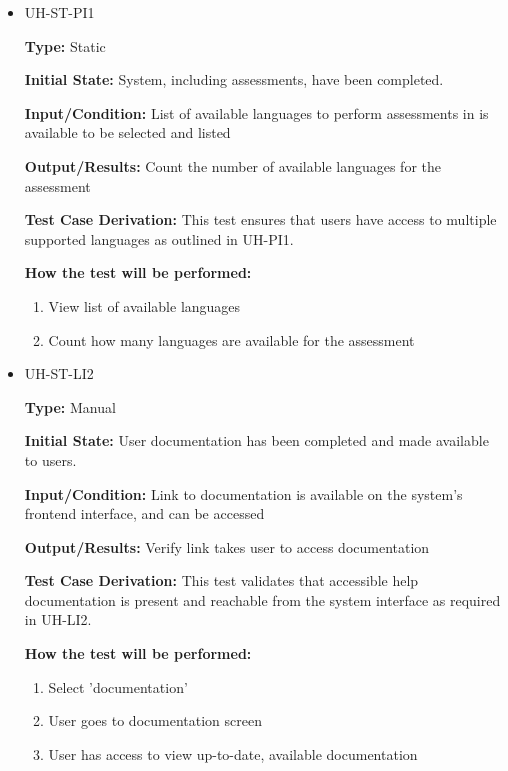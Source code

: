 \documentclass[12pt, titlepage]{article}
\begin{document}
\begin{itemize}
  \item UH-ST-PI1
  \begin{mdframed}[linewidth=0.5mm]
      \textbf{Type:} Static \par
      \textbf{Initial State:} System, including assessments, have been completed. \par
      \textbf{Input/Condition:} List of available languages to perform assessments in is available to be selected and listed \par
      \textbf{Output/Results:} Count the number of available languages for the assessment \par
      \textbf{Test Case Derivation:} This test ensures that users have access to multiple supported languages as outlined in UH-PI1. \par
      \textbf{How the test will be performed:}
      \begin{enumerate}[noitemsep]
        \item View list of available languages
        \item Count how many languages are available for the assessment
      \end{enumerate}
  \end{mdframed}

  \item UH-ST-LI2
  \begin{mdframed}[linewidth=0.5mm]
      \textbf{Type:} Manual \par
      \textbf{Initial State:} User documentation has been completed and made available to users. \par
      \textbf{Input/Condition:} Link to documentation is available on the system's frontend interface, and can be accessed \par
      \textbf{Output/Results:} Verify link takes user to access documentation \par
      \textbf{Test Case Derivation:} This test validates that accessible help documentation is present and reachable from the system interface as required in UH-LI2. \par
      \textbf{How the test will be performed:}
      \begin{enumerate}[noitemsep]
        \item Select 'documentation'
        \item User goes to documentation screen
        \item User has access to view up-to-date, available documentation
      \end{enumerate}
  \end{mdframed}
\end{itemize}
\end{document}

